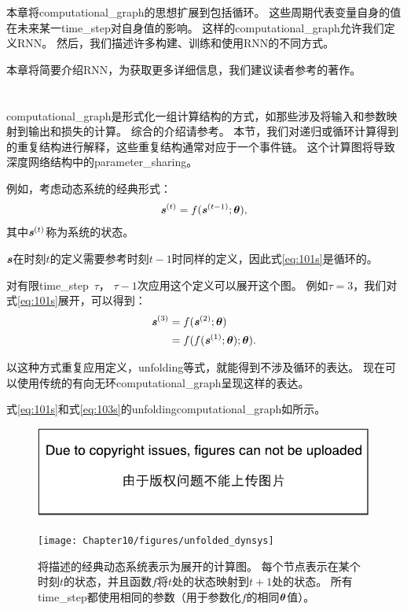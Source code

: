 本章将\gls{computational_graph}的思想扩展到包括循环。
这些周期代表变量自身的值在未来某一\gls{time_step}对自身值的影响。
这样的\gls{computational_graph}允许我们定义\gls{RNN}。
然后，我们描述许多构建、训练和使用\gls{RNN}的不同方式。

本章将简要介绍\gls{RNN}，为获取更多详细信息，我们建议读者参考\cite{Graves-book2012}的著作。


\section{}
\label{sec:unfolding_computational_graphs}
\gls{computational_graph}是形式化一组计算结构的方式，如那些涉及将输入和参数映射到输出和损失的计算。
综合的介绍请参考。
本节，我们对递归或循环计算得到的重复结构进行解释，这些重复结构通常对应于一个事件链。
这个计算图将导致深度网络结构中的\gls{parameter_sharing}。

例如，考虑动态系统的经典形式：
\begin{align}
\label{eq:101s}
\boldsymbol{\mathit{s}}^{(t)} = f(\boldsymbol{\mathit{s}}^{(t-1)}; \boldsymbol{\theta}),
\end{align}
其中$ \boldsymbol{\mathit{s}}^{(t)}$称为系统的状态。

$\boldsymbol{\mathit{s}}$在时刻$t$的定义需要参考时刻$t-1$时同样的定义，因此式\eqref{eq:101s}是循环的。

对有限\gls{time_step}~$\tau$， $\tau-1$次应用这个定义可以展开这个图。
例如$\tau = 3$，我们对式\eqref{eq:101s}展开，可以得到：
\begin{align}
 \boldsymbol{\mathit{s}}^{(3)} &= f(\boldsymbol{\mathit{s}}^{(2)}; \boldsymbol{\theta}) \\
 & = f(f(\boldsymbol{\mathit{s}}^{(1)}; \boldsymbol{\theta}) ; \boldsymbol{\theta}).
  \label{eq:103s}
\end{align}

以这种方式重复应用定义，\gls{unfolding}等式，就能得到不涉及循环的表达。
现在可以使用传统的有向无环\gls{computational_graph}呈现这样的表达。

式\eqref{eq:101s}和式\eqref{eq:103s}的\gls{unfolding}\gls{computational_graph}如所示。
\begin{figure}[!htb]
\ifOpenSource
\centerline{\includegraphics{figure.pdf}}
\else
\centerline{\texttt{[image: Chapter10/figures/unfolded\_dynsys]}}
\fi
\caption{将描述的经典动态系统表示为展开的计算图。
每个节点表示在某个时刻$t$的状态，并且函数$f$将$t$处的状态映射到$t+1$处的状态。
所有\gls{time_step}都使用相同的参数（用于参数化$f$的相同$\boldsymbol{\theta}$值）。
}
\label{fig:chap10_unfolded_dynsys}
\end{figure}

